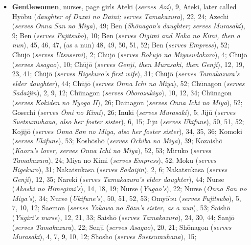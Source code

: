 \documentclass{article}
\begin{document}
\begin{multicols}{2}
\begin{itemize}[
			label=,
			leftmargin=0em,
			rightmargin=-1.5em,
			itemindent=-2em,
			nosep,
		]
		\item \textbf{Gentlewomen}, nurses, page girls Ateki (\textit{serves Aoi}), 9,
		      Ateki, later called Hyōbu (\textit{daughter of Dazai no Daini; serves Tamakazura}), 22, 24;
		      Azechi (\textit{serves Onna San no Miya}), 49;
		      Ben (\textit{Shōnagon's daughter; serves Murasaki}), 9;
		      Ben (\textit{serves Fujitsubo}), 10;
		      Ben (\textit{serves Ōigimi and Naka no Kimi, then a nun}), 45, 46, 47, (as a nun) 48, 49, 50, 51, 52;
		      Ben (\textit{serves Empress}), 52;
		      Chūjō (\textit{serves Utsusemi}), 2;
		      Chūjō (\textit{serves Rokujō no Miyasudokoro}), 4;
		      Chūjō (\textit{serves Asagao}), 10;
		      Chūjō (\textit{serves Genji, then Murasaki, then Genji}), 12, 19, 23, 41;
		      Chūjō (\textit{serves Higekuro's first wife}), 31;
		      Chūjō (\textit{serves Tamakazura's elder daughter}), 44;
		      Chūjō (\textit{serves Onna Ichi no Miya}), 52;
		      Chūnagon (\textit{serves Sadaijin}), 2, 9, 12;
		      Chūnagon (\textit{serves Oborozukiyo}), 10, 12, 34;
		      Chūnagon (\textit{serves Kokiden no Nyōgo II}), 26;
		      Dainagon (\textit{serves Onna Ichi no Miya}), 52;
		      Gosechi (\textit{serves Ōmi no Kimi}), 26;
		      Inuki (\textit{serves Murasaki}), 5;
		      Jijū (\textit{serves Suetsumuhana, also her foster sister}), 6, 15;
		      Jijū (\textit{serves Ukifune}), 50, 51, 52;
		      Kojijō (\textit{serves Onna San no Miya, also her foster sister}), 34, 35, 36;
		      Komoki (\textit{serves Ukifune}), 53;
		      Koshōshō (\textit{serves Ochiba no Miya}), 39;
		      Kozaishō (\textit{Kaoru's lover, serves Onna Ichi no Miya}), 52, 53;
		      Miruko (\textit{serves Tamakazura}), 24;
		      Miya no Kimi (\textit{serves Empress}), 52;
		      Moku (\textit{serves Higekuro}), 31;
		      Nakatsukasa (\textit{serves Sadaijin}), 2, 6;
		      Nakatsukasa (\textit{serves Genji}), 12, 35;
		      Nareki (\textit{serves Tamakazura's elder daughter}), 44;
		      Nurse (\textit{Akashi no Himegimi's}), 14, 18, 19;
		      Nurse (\textit{Yūgao's}), 22;
		      Nurse (\textit{Onna San no Miya's}), 34;
		      Nurse (\textit{Ukifune's}), 50, 51, 52, 53;
		      Omyōbu (\textit{serves Fujitsubo}), 5, 7, 10, 12;
		      Saemon (\textit{serves Yokawa no Sōzu's sister, as a nun}), 53;
		      Saishō (\textit{Yūgiri's nurse}), 12, 21, 33;
		      Saishō (\textit{serves Tamakazura}), 24, 30, 44;
		      Sanjō (\textit{serves Tamakazura}), 22;
		      Senji (\textit{serves Asagao}), 20, 21;
		      Shōnagon (\textit{serves Murasaki}), 4, 7, 9, 10, 12;
		      Shōshō (\textit{serves Suetsumuhana}), 15;

\end{itemize}
\end{multicols}
\end{document}
